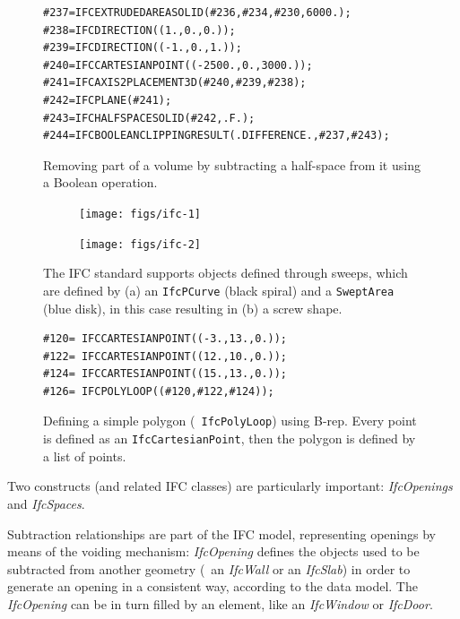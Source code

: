\begin{figure}
\begin{lstlisting}[frame=single]
#237=IFCEXTRUDEDAREASOLID(#236,#234,#230,6000.);
#238=IFCDIRECTION((1.,0.,0.));
#239=IFCDIRECTION((-1.,0.,1.));
#240=IFCCARTESIANPOINT((-2500.,0.,3000.));
#241=IFCAXIS2PLACEMENT3D(#240,#239,#238);
#242=IFCPLANE(#241);
#243=IFCHALFSPACESOLID(#242,.F.);
#244=IFCBOOLEANCLIPPINGRESULT(.DIFFERENCE.,#237,#243);
\end{lstlisting}
\caption{Removing part of a volume by subtracting a half-space from it using a Boolean operation.}%
\label{fig:csg}
\end{figure}

\begin{figure}
\centering
\begin{subfigure}[b]{0.45\linewidth}
	\texttt{[image: figs/ifc-1]}%
	\label{subfig:ifc-1}
\end{subfigure}
\begin{subfigure}[b]{0.45\linewidth}
	\texttt{[image: figs/ifc-2]}%
	\label{subfig:ifc-2}
\end{subfigure}
\caption{The IFC standard supports objects defined through sweeps, which are defined by (a) an \texttt{IfcPCurve} (black spiral) and a \texttt{SweptArea} (blue disk), in this case resulting in (b) a screw shape.}%
\label{fig:sweeps}
\end{figure}

\begin{figure}
\begin{lstlisting}[frame=single]
#120= IFCCARTESIANPOINT((-3.,13.,0.));
#122= IFCCARTESIANPOINT((12.,10.,0.));
#124= IFCCARTESIANPOINT((15.,13.,0.));
#126= IFCPOLYLOOP((#120,#122,#124));
\end{lstlisting}
\caption{Defining a simple polygon (\ie\ \texttt{IfcPolyLoop}) using B-rep.
Every point is defined as an \texttt{IfcCartesianPoint}, then the polygon is defined by a list of points.}%
\label{fig:brep}
\end{figure}


Two constructs (and related IFC classes) are particularly important: \textit{IfcOpenings} and \textit{IfcSpaces}.

Subtraction relationships are part of the IFC model, representing openings by means of the voiding mechanism:
\textit{IfcOpening} defines the objects used to be subtracted from another geometry (\eg\ an \textit{IfcWall} or an \textit{IfcSlab}) in order to generate an opening in a consistent way, according to the data model.
The \textit{IfcOpening} can be in turn filled by an element, like an \textit{IfcWindow} or \textit{IfcDoor}.


